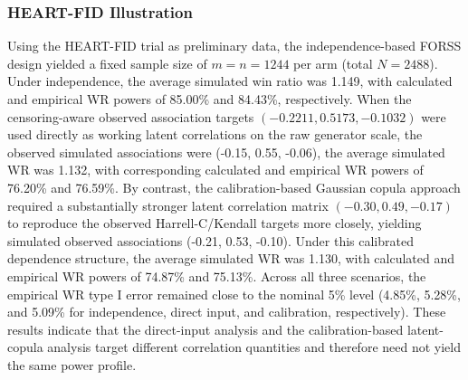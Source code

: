 \subsubsection{HEART-FID Illustration}\label{sec:heartfid_results}

Using the HEART-FID trial as preliminary data, the independence-based FORSS design yielded a fixed sample size of $m=n=1244$ per arm (total $N=2488$). Under independence, the average simulated win ratio was 1.149, with calculated and empirical WR powers of 85.00\% and 84.43\%, respectively. 
When the censoring-aware observed association targets $(-0.2211, 0.5173, -0.1032)$ were used directly as working latent correlations on the raw generator scale, the observed simulated associations were (-0.15, 0.55, -0.06), the average simulated WR was 1.132, with corresponding calculated and empirical WR powers of 76.20\% and 76.59\%. 
By contrast, the calibration-based Gaussian copula approach required a substantially stronger latent correlation matrix $(-0.30, 0.49, -0.17)$ to reproduce the observed Harrell-C/Kendall targets more closely, yielding simulated observed associations (-0.21, 0.53, -0.10). Under this calibrated dependence structure, the average simulated WR was 1.130, with calculated and empirical WR powers of 74.87\% and 75.13\%. 
Across all three scenarios, the empirical WR type I error remained close to the nominal 5\% level (4.85\%, 5.28\%, and 5.09\% for independence, direct input, and calibration, respectively). These results indicate that the direct-input analysis and the calibration-based latent-copula analysis target different correlation quantities and therefore need not yield the same power profile.
